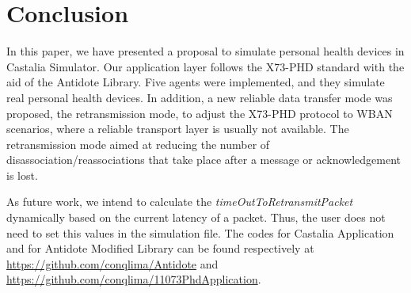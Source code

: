 \section{Conclusion}\label{conclusion}
In this paper, we have presented a proposal to simulate personal health devices in Castalia Simulator. Our application layer follows the X73-PHD standard with the aid of the Antidote Library. Five agents were implemented, and they simulate real personal health devices. In addition, a new reliable data transfer mode was proposed, the retransmission mode, to adjust the X73-PHD protocol to WBAN scenarios, where a reliable transport layer is usually not available. The retransmission mode aimed at reducing the number of disassociation/reassociations that take place after a message or acknowledgement is lost.

As future work, we intend to calculate the \textit{timeOutToRetransmitPacket} dynamically based on the current latency of a packet. Thus, the user does not need to set this values in the simulation file. The codes for Castalia Application and for Antidote Modified Library can be found respectively at \url{https://github.com/conqlima/Antidote} and \url{https://github.com/conqlima/11073PhdApplication}.

